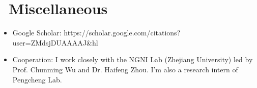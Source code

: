 \documentclass{resume}
\begin{document}

\section{\faInfo\ Miscellaneous}
\begin{itemize}[parsep=0.5ex]
  \item Google Scholar: https://scholar.google.com/citations?user=ZMdsjDUAAAAJ\&hl
  \item Cooperation: I work closely with the NGNI Lab (Zhejiang University) led by Prof. Chunming Wu and Dr. Haifeng Zhou. I'm also a research intern of Pengcheng Lab.
\end{itemize}

\newpage
\end{document}
